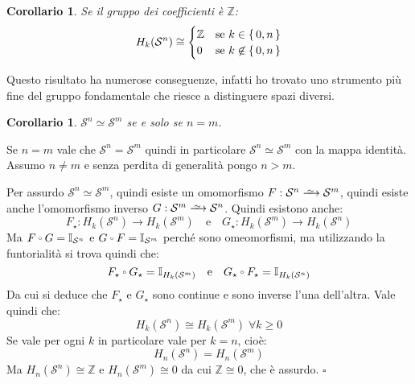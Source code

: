 \documentclass[10pt, twoside=false, x11names]{scrbook}
\newtheorem{corollary}[theorem]{Corollario}
\newenvironment{proof}{{\textbf{Dimostrazione}:}}{\hfill $\square$}
\newcommand{\Z}{\mathbb{Z}}
\newcommand{\Id}[1][]{\mathbb{I}_#1}
\newcommand{\Sph}[1][]{\mathcal{S}^#1}
\newcommand{\homoto}{\xrightarrow{\,\smash{\raisebox{-0.65ex}{\ensuremath{\scriptstyle\sim}}}\,}}
\let\latexcirc=\circ
\newcommand{\ccirc}{\mathbin{\mathchoice
  {\xcirc\scriptstyle}
  {\xcirc\scriptstyle}
  {\xcirc\scriptscriptstyle}
  {\xcirc\scriptscriptstyle}
}}
\newcommand{\xcirc}[1]{\vcenter{\hbox{$#1\latexcirc$}}}
\let\circ\ccirc
\begin{document}

\begin{corollary}
  Se il gruppo dei coefficienti è $ \Z $:
  \[
    H_k(\Sph{n}) \cong
    \begin{cases}
      \Z & \text{se } k \in \set{0, n} \\
      0 & \text{se } k \not \in \set{0, n}
    \end{cases}
  \]
\end{corollary}
Questo risultato ha numerose conseguenze, infatti ho trovato uno
strumento più fine del gruppo fondamentale che riesce a distinguere
spazi diversi.

\begin{corollary}
  $ \Sph{n} \simeq \Sph{m} $ se e solo se $ n = m $.
\end{corollary}
\begin{proof}
  Se $ n = m $ vale che $ \Sph{n} = \Sph{m} $ quindi in particolare
  $ \Sph{n} \simeq \Sph{m} $ con la mappa identità. Assumo $ n \not = m $
  e senza perdita di generalità pongo $ n > m $.

  Per assurdo $ \Sph{n} \simeq \Sph{m} $, quindi esiste un omomorfismo
  $ F: \Sph{n} \homoto \Sph{m} $, quindi esiste anche l'omomorfismo
  inverso $ G: \Sph{m} \homoto \Sph{n} $.
  Quindi esistono anche:
  \[
    F_\star: H_k(\Sph{n}) \to H_k(\Sph{m}) \quad \text{e} \quad G_\star: H_k(\Sph{m}) \to H_k(\Sph{n})
  \]
  Ma $ F \circ G = \Id{\Sph{n}} $ e $ G \circ F = \Id{\Sph{m}} $ perché sono omeomorfismi,
  ma utilizzando la funtorialità si trova quindi che:
  \[
    F_\star \circ G_\star = \Id{H_k(\Sph{m})} \quad \text{e} \quad G_\star \circ F_\star = \Id{H_k(\Sph{n})}
  \]
  Da cui si deduce che $ F_\star $ e $ G_\star $ sono continue e sono inverse l'una
  dell'altra.
  Vale quindi che:
  \[
    H_k(\Sph{n}) \cong H_k(\Sph{m}) \; \forall k \geq 0
  \]
  Se vale per ogni $ k $ in particolare vale per $ k = n $, cioè:
  \[
    H_n(\Sph{n}) = H_n(\Sph{m})
  \]
  Ma $ H_n(\Sph{n}) \cong \Z $ e $ H_n(\Sph{m}) \cong 0 $ da cui $ \Z \cong 0 $, che è assurdo.
\end{proof}
\end{document}

